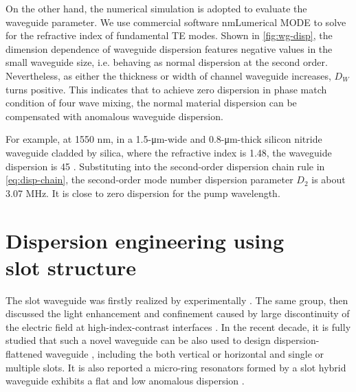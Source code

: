 \begin{figure}
    \centering
    
    \label{fig:Luke-si3n4}
\end{figure}

On the other hand, the numerical simulation is adopted to evaluate the waveguide parameter.
We use commercial software \si{\nm}{Lumerical MODE} to solve for the refractive index of fundamental TE modes.
Shown in \autoref{fig:wg-disp}, the dimension dependence of waveguide dispersion features negative values in the small waveguide size, i.e. behaving as normal dispersion at the second order. Nevertheless, as either the thickness or width of channel waveguide increases,
$D_W$ turns positive. This indicates that to achieve zero dispersion in phase match condition of four wave mixing, the normal material dispersion can be compensated with anomalous waveguide dispersion. 

For example, at 1550 \si{\nm}, in a 1.5-\si{\um}-wide and 0.8-\si{\um}-thick silicon nitride waveguide cladded by silica, where the refractive index is 1.48,
the waveguide dispersion is 45 \dispu. Substituting into the second-order dispersion chain rule in \autoref{eq:disp-chain}, the second-order mode number dispersion parameter $ D_2 $ is about 3.07 MHz. It is close to zero dispersion for the pump wavelength.

\begin{figure}
	\centering
	
	\label{fig:wg-disp}
\end{figure}

\section[{Dispersion engineering using slot structure}]{Dispersion engineering using \\ slot structure}

The slot waveguide was firstly realized by \citeauthor{Xu2004} experimentally \cite{Xu2004}. The same group, \citeauthor{Almeida2004} then discussed the light enhancement and confinement caused by large discontinuity of the electric field at high-index-contrast interfaces \cite{Almeida2004}. In the recent decade, it is fully studied that such a novel waveguide can be also used to design dispersion-flattened waveguide \cites{Mas2010, Zhang2010, Zhu2012, Nolte2013}, including the both vertical or horizontal and single or multiple slots. It is also reported a micro-ring resonators formed by a slot hybrid waveguide 
exhibits a flat and low anomalous dispersion \cite{Zhang2013}.


